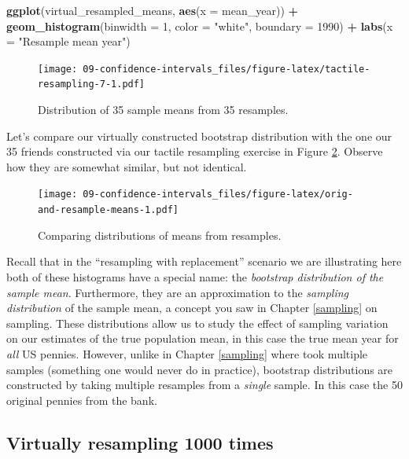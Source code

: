 \documentclass[
]{book}
\newenvironment{Shaded}{\begin{snugshade}}{\end{snugshade}}
\newcommand{\DataTypeTok}[1]{\textcolor[rgb]{0.13,0.29,0.53}{#1}}
\newcommand{\DecValTok}[1]{\textcolor[rgb]{0.00,0.00,0.81}{#1}}
\newcommand{\KeywordTok}[1]{\textcolor[rgb]{0.13,0.29,0.53}{\textbf{#1}}}
\newcommand{\NormalTok}[1]{#1}
\newcommand{\OperatorTok}[1]{\textcolor[rgb]{0.81,0.36,0.00}{\textbf{#1}}}
\newcommand{\StringTok}[1]{\textcolor[rgb]{0.31,0.60,0.02}{#1}}
\begin{document}
\begin{Shaded}
\begin{Highlighting}[]
\KeywordTok{ggplot}\NormalTok{(virtual_resampled_means, }\KeywordTok{aes}\NormalTok{(}\DataTypeTok{x =}\NormalTok{ mean_year)) }\OperatorTok{+}
\StringTok{  }\KeywordTok{geom_histogram}\NormalTok{(}\DataTypeTok{binwidth =} \DecValTok{1}\NormalTok{, }\DataTypeTok{color =} \StringTok{"white"}\NormalTok{, }\DataTypeTok{boundary =} \DecValTok{1990}\NormalTok{) }\OperatorTok{+}
\StringTok{  }\KeywordTok{labs}\NormalTok{(}\DataTypeTok{x =} \StringTok{"Resample mean year"}\NormalTok{)}
\end{Highlighting}
\end{Shaded}

\begin{figure}
\centering
\texttt{[image: 09-confidence-intervals\_files/figure-latex/tactile-resampling-7-1.pdf]}
\caption{\label{fig:tactile-resampling-7}Distribution of 35 sample means from 35 resamples.}
\end{figure}

Let's compare our virtually constructed bootstrap distribution with the one our 35 friends constructed via our tactile resampling exercise in Figure \ref{fig:orig-and-resample-means}. Observe how they are somewhat similar, but not identical.

\begin{figure}
\centering
\texttt{[image: 09-confidence-intervals\_files/figure-latex/orig-and-resample-means-1.pdf]}
\caption{\label{fig:orig-and-resample-means}Comparing distributions of means from resamples.}
\end{figure}

Recall that in the ``resampling with replacement'' scenario we are illustrating here both of these histograms have a special name: the \emph{bootstrap distribution of the sample mean}. Furthermore, they are an approximation to the \emph{sampling distribution} of the sample mean, a concept you saw in Chapter \ref{sampling} on sampling. These distributions allow us to study the effect of sampling variation on our estimates of the true population mean, in this case the true mean year for \emph{all} US pennies. However, unlike in Chapter \ref{sampling} where took multiple samples (something one would never do in practice), bootstrap distributions are constructed by taking multiple resamples from a \emph{single} sample. In this case the 50 original pennies from the bank.

\hypertarget{bootstrap-1000-replicates}{%
\subsection{Virtually resampling 1000 times}\label{bootstrap-1000-replicates}}
\end{document}
